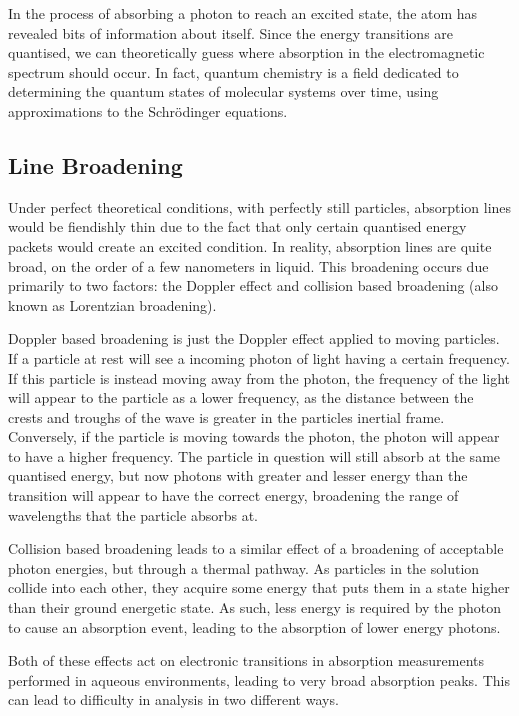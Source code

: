 In the process of absorbing a photon to reach an excited state, the atom has
revealed bits of information about itself. Since the energy transitions are
quantised, we can theoretically guess where absorption in the electromagnetic
spectrum should occur.  In fact, quantum chemistry is a field dedicated
to determining the quantum states of molecular systems over time, using
approximations to the Schr\"odinger equations.

\subsection{Line Broadening}

Under perfect theoretical conditions, with perfectly still particles,
absorption lines would be fiendishly thin due to the fact that only certain
quantised energy packets would create an excited condition. In reality,
absorption lines are quite broad, on the order of a few nanometers in liquid.
This broadening occurs due primarily to two factors: the Doppler effect and
collision based broadening (also known as Lorentzian broadening).

Doppler based broadening is just the Doppler effect applied to moving
particles. If a particle at rest will see a incoming photon of light having a
certain frequency. If this particle is instead moving away from the photon,
the frequency of the light will appear to the particle as a lower frequency,
as the distance between the crests and troughs of the wave is greater in the
particles inertial frame. Conversely, if the particle is moving towards the
photon, the photon will appear to have a higher frequency. The particle in
question will still absorb at the same quantised energy, but now photons with
greater and lesser energy than the transition will appear to have the correct
energy, broadening the range of wavelengths that the particle absorbs at.

Collision based broadening leads to a similar effect of a broadening of
acceptable photon energies, but through a thermal pathway. As particles in
the solution collide into each other, they acquire some energy that puts them
in a state higher than their ground energetic state. As such, less energy is
required by the photon to cause an absorption event, leading to the absorption
of lower energy photons.

Both of these effects act on electronic transitions in absorption measurements
performed in aqueous environments, leading to very broad absorption peaks.
This can lead to difficulty in analysis in two different ways.

